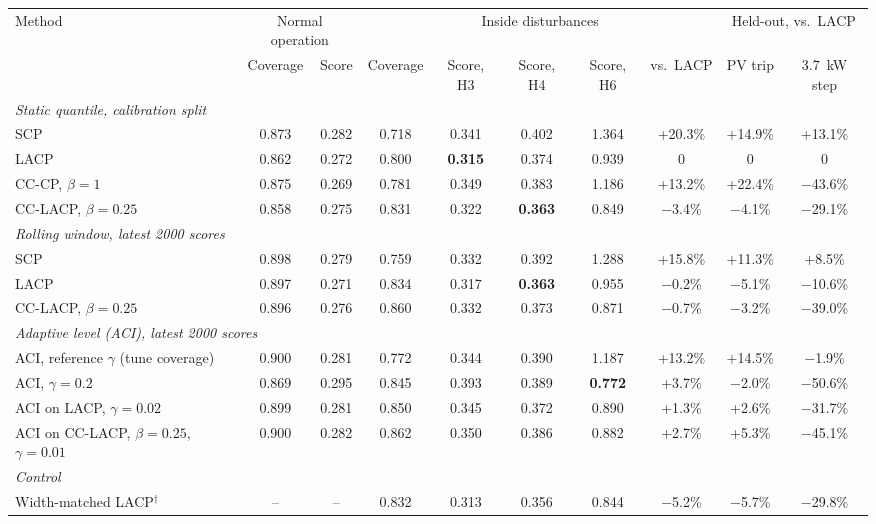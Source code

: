 \begin{tabular}{|l|c|c|c|c|c|c|c|c|c|}
\hline
\multirow{2}{*}{Method} & \multicolumn{2}{c|}{Normal operation} & \multicolumn{5}{c|}{Inside disturbances} & \multicolumn{2}{c|}{Held-out, vs.\ LACP}\\
\cline{2-10}
 & Coverage & Score & Coverage & Score, H3 & Score, H4 & Score, H6 & vs.\ LACP & PV trip & 3.7~kW step\\
\hline
\multicolumn{10}{|l|}{\emph{Static quantile, calibration split}}\\
\quad SCP & 0.873 & 0.282 & 0.718 & 0.341 & 0.402 & 1.364 & +20.3\% & +14.9\% & +13.1\%\\
\quad LACP & 0.862 & 0.272 & 0.800 & \textbf{0.315} & 0.374 & 0.939 & 0 & 0 & 0\\
\quad CC-CP, $\beta=1$ & 0.875 & 0.269 & 0.781 & 0.349 & 0.383 & 1.186 & +13.2\% & +22.4\% & $-$43.6\%\\
\rowcolor{black!6}
\quad CC-LACP, $\beta=0.25$ & 0.858 & 0.275 & 0.831 & 0.322 & \textbf{0.363} & 0.849 & $-$3.4\% & $-$4.1\% & $-$29.1\%\\
\hline
\multicolumn{10}{|l|}{\emph{Rolling window, latest 2000 scores}}\\
\quad SCP & 0.898 & 0.279 & 0.759 & 0.332 & 0.392 & 1.288 & +15.8\% & +11.3\% & +8.5\%\\
\quad LACP & 0.897 & 0.271 & 0.834 & 0.317 & \textbf{0.363} & 0.955 & $-$0.2\% & $-$5.1\% & $-$10.6\%\\
\quad CC-LACP, $\beta=0.25$ & 0.896 & 0.276 & 0.860 & 0.332 & 0.373 & 0.871 & $-$0.7\% & $-$3.2\% & $-$39.0\%\\
\hline
\multicolumn{10}{|l|}{\emph{Adaptive level (ACI), latest 2000 scores}}\\
\quad ACI, reference $\gamma$ (tune coverage) & 0.900 & 0.281 & 0.772 & 0.344 & 0.390 & 1.187 & +13.2\% & +14.5\% & $-$1.9\%\\
\quad ACI, $\gamma=0.2$ & 0.869 & 0.295 & 0.845 & 0.393 & 0.389 & \textbf{0.772} & +3.7\% & $-$2.0\% & $-$50.6\%\\
\quad ACI on LACP, $\gamma=0.02$ & 0.899 & 0.281 & 0.850 & 0.345 & 0.372 & 0.890 & +1.3\% & +2.6\% & $-$31.7\%\\
\quad ACI on CC-LACP, $\beta=0.25$, $\gamma=0.01$ & 0.900 & 0.282 & 0.862 & 0.350 & 0.386 & 0.882 & +2.7\% & +5.3\% & $-$45.1\%\\
\hline
\multicolumn{10}{|l|}{\emph{Control}}\\
\quad Width-matched LACP$^{\dagger}$ & -- & -- & 0.832 & 0.313 & 0.356 & 0.844 & $-$5.2\% & $-$5.7\% & $-$29.8\%\\
\hline
\end{tabular}

